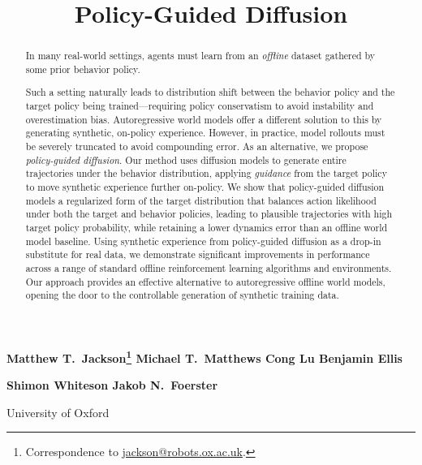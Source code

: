 \documentclass[10pt]{article} %
\title{Policy-Guided Diffusion}
\author{
}
\theoremstyle{plain}
\theoremstyle{definition}
\theoremstyle{remark}
\begin{document}
\maketitle

\renewcommand{\thefootnote}{\fnsymbol{footnote}}

\vspace{-10mm}
\centerline{\textbf{
Matthew T.\ Jackson\footnote{Correspondence to \href{mailto:jackson@robots.ox.ac.uk}{jackson@robots.ox.ac.uk}.}\hspace{3mm}
Michael T.\ Matthews\hspace{3mm}
Cong Lu\hspace{3mm}
Benjamin Ellis
}}
\centerline{\textbf{
Shimon Whiteson\footnotemark{}\hspace{3mm}
Jakob N.\ Foerster\footnotemark[2]{} %
}}
\vspace{2mm}
\centerline{University of Oxford}

\vspace{10mm}


\begin{abstract}
In many real-world settings, agents must learn from an \textit{offline} dataset gathered by some prior behavior policy. 

Such a setting naturally leads to distribution shift between the behavior policy and the target policy being trained---requiring policy conservatism to avoid instability and overestimation bias.
Autoregressive world models offer a different solution to this by generating synthetic, on-policy experience.
However, in practice, model rollouts must be severely truncated to avoid compounding error.
As an alternative, we propose \textit{policy-guided diffusion}.
Our method uses diffusion models to generate entire trajectories under the behavior distribution, applying \textit{guidance} from the target policy to move synthetic experience further on-policy.
We show that policy-guided diffusion models a regularized form of the target distribution that balances action likelihood under both the target and behavior policies, leading to plausible trajectories with high target policy probability, 
while retaining a lower dynamics error than an offline world model baseline.
Using synthetic experience from policy-guided diffusion as a drop-in substitute for real data, we demonstrate significant improvements in performance across a range of standard offline reinforcement learning algorithms and environments.
Our approach provides an effective alternative to autoregressive offline world models, opening the door to the controllable generation of synthetic training data.
\end{abstract}
\end{document}
